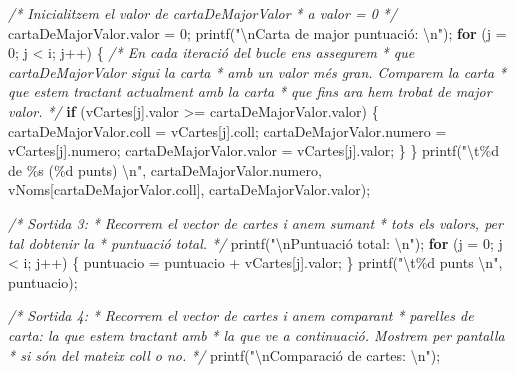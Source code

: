 \documentclass[
]{book}
\newenvironment{Shaded}{\begin{snugshade}}{\end{snugshade}}
\newcommand{\CommentTok}[1]{\textcolor[rgb]{0.56,0.35,0.01}{\textit{#1}}}
\newcommand{\ControlFlowTok}[1]{\textcolor[rgb]{0.13,0.29,0.53}{\textbf{#1}}}
\newcommand{\DecValTok}[1]{\textcolor[rgb]{0.00,0.00,0.81}{#1}}
\newcommand{\NormalTok}[1]{#1}
\newcommand{\SpecialCharTok}[1]{\textcolor[rgb]{0.00,0.00,0.00}{#1}}
\newcommand{\StringTok}[1]{\textcolor[rgb]{0.31,0.60,0.02}{#1}}
\begin{document}
\begin{Shaded}
\begin{Highlighting}[]
    \CommentTok{/* Inicialitzem el valor de cartaDeMajorValor}
\CommentTok{     * a valor = 0}
\CommentTok{     */}
\NormalTok{    cartaDeMajorValor.valor = }\DecValTok{0}\NormalTok{;}
\NormalTok{    printf(}\StringTok{"}\SpecialCharTok{\textbackslash{}n}\StringTok{Carta de major puntuació: }\SpecialCharTok{\textbackslash{}n}\StringTok{"}\NormalTok{);}
    \ControlFlowTok{for}\NormalTok{ (j = }\DecValTok{0}\NormalTok{; j \textless{} i; j++) \{}
        \CommentTok{/* En cada iteració del bucle ens assegurem}
\CommentTok{         * que cartaDeMajorValor sigui la carta}
\CommentTok{         * amb un valor més gran. Comparem la carta}
\CommentTok{         * que estem tractant actualment amb la carta}
\CommentTok{         * que fins ara hem trobat de major valor.}
\CommentTok{         */}
        \ControlFlowTok{if}\NormalTok{ (vCartes[j].valor \textgreater{}= cartaDeMajorValor.valor) \{}
\NormalTok{            cartaDeMajorValor.coll = vCartes[j].coll;}
\NormalTok{            cartaDeMajorValor.numero = vCartes[j].numero;}
\NormalTok{            cartaDeMajorValor.valor = vCartes[j].valor;}
\NormalTok{        \}}
\NormalTok{    \}}
\NormalTok{    printf(}\StringTok{"}\SpecialCharTok{\textbackslash{}t}\StringTok{\%d de \%s (\%d punts) }\SpecialCharTok{\textbackslash{}n}\StringTok{"}\NormalTok{, cartaDeMajorValor.numero, vNoms[cartaDeMajorValor.coll], cartaDeMajorValor.valor);}

    \CommentTok{/* Sortida 3:}
\CommentTok{     * Recorrem el vector de cartes i anem sumant}
\CommentTok{     * tots els valors, per tal d\textquotesingle{}obtenir la }
\CommentTok{     * puntuació total.}
\CommentTok{     */}
\NormalTok{    printf(}\StringTok{"}\SpecialCharTok{\textbackslash{}n}\StringTok{Puntuació total: }\SpecialCharTok{\textbackslash{}n}\StringTok{"}\NormalTok{);}
    \ControlFlowTok{for}\NormalTok{ (j = }\DecValTok{0}\NormalTok{; j \textless{} i; j++) \{}
\NormalTok{        puntuacio = puntuacio + vCartes[j].valor;}
\NormalTok{    \}}
\NormalTok{    printf(}\StringTok{"}\SpecialCharTok{\textbackslash{}t}\StringTok{\%d punts }\SpecialCharTok{\textbackslash{}n}\StringTok{"}\NormalTok{, puntuacio);}
    
    \CommentTok{/* Sortida 4:}
\CommentTok{     * Recorrem el vector de cartes i anem comparant}
\CommentTok{     * parelles de carta: la que estem tractant amb}
\CommentTok{     * la que ve a continuació. Mostrem per pantalla}
\CommentTok{     * si són del mateix coll o no.}
\CommentTok{     */}
\NormalTok{    printf(}\StringTok{"}\SpecialCharTok{\textbackslash{}n}\StringTok{Comparació de cartes: }\SpecialCharTok{\textbackslash{}n}\StringTok{"}\NormalTok{);}
    

\end{Highlighting}
\end{Shaded}
\end{document}
